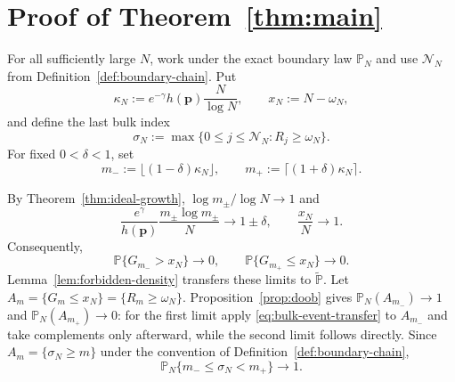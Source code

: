 \documentclass[journal]{IEEEtran}
\theoremstyle{plain}
\theoremstyle{definition}
\theoremstyle{remark}
\newcommand{\Pideal}{\mathbb P}
\newcommand{\Pforb}{\widetilde{\mathbb P}}
\newcommand{\Pbound}{\mathbb P_N}
\newcommand{\hp}{h(\mathbf p)}
\begin{document}
\section{Proof of Theorem~\ref{thm:main}}\label{sec:main-proof}

For all sufficiently large $N$, work under the exact boundary law $\Pbound$ and use $\mathcal N_N$ from Definition~\ref{def:boundary-chain}.  Put
\begin{equation}\label{eq:kappa}
 \kappa_N:=e^{-\gamma}\hp\frac{N}{\log N},
 \qquad
 x_N:=N-\omega_N,
\end{equation}
and define the last bulk index
\begin{equation}\label{eq:sigma}
 \sigma_N:=\max\{0\le j\le\mathcal N_N:R_j\ge\omega_N\}.
\end{equation}
For fixed $0<\delta<1$, set
\begin{equation}\label{eq:m-pm}
 m_-:=\lfloor(1-\delta)\kappa_N\rfloor,
 \qquad
 m_+:=\lceil(1+\delta)\kappa_N\rceil.
\end{equation}

By Theorem~\ref{thm:ideal-growth}, $\log m_\pm/\log N\to1$ and
\begin{equation*}
 \frac{e^\gamma}{\hp}\frac{m_\pm\log m_\pm}{N}
 \longrightarrow1\pm\delta,
 \qquad
 \frac{x_N}{N}\longrightarrow1.
\end{equation*}
Consequently,
\begin{equation}\label{eq:ideal-sandwich}
 \Pideal\{G_{m_-}>x_N\}\longrightarrow0,
 \qquad
 \Pideal\{G_{m_+}\le x_N\}\longrightarrow0.
\end{equation}
Lemma~\ref{lem:forbidden-density} transfers these limits to $\Pforb$.  Let $A_m=\{G_m\le x_N\}=\{R_m\ge\omega_N\}$.  Proposition~\ref{prop:doob} gives $\Pbound(A_{m_-})\to1$ and $\Pbound(A_{m_+})\to0$: for the first limit apply \eqref{eq:bulk-event-transfer} to $A_{m_-}$ and take complements only afterward, while the second limit follows directly.  Since $A_m=\{\sigma_N\ge m\}$ under the convention of Definition~\ref{def:boundary-chain},
\begin{equation}\label{eq:sigma-sandwich}
 \Pbound\{m_-\le\sigma_N<m_+\}\longrightarrow1.
\end{equation}
\end{document}
